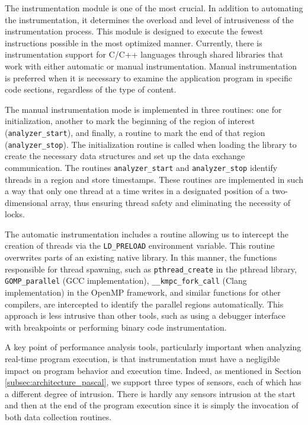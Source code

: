 The instrumentation module is one of the most crucial. In addition to automating the instrumentation, it determines the overload and level of intrusiveness of the instrumentation process. This module is designed to execute the fewest instructions possible in the most optimized manner. Currently, there is instrumentation support for C/C++ languages through shared libraries that work with either automatic or manual instrumentation. Manual instrumentation is preferred when it is necessary to examine the application program in specific code sections, regardless of the type of content. 

The manual instrumentation mode is implemented in three routines: one for initialization, another to mark the beginning of the region of interest ({\tt analyzer\_start}), and finally, a routine to mark the end of that region ({\tt analyzer\_stop}). The initialization routine is called when loading the library to create the necessary data structures and set up the data exchange communication. The routines {\tt analyzer\_start} and {\tt analyzer\_stop} identify threads in a region and store timestamps. These routines are implemented in such a way that only one thread at a time writes in a designated position of a two-dimensional array, thus ensuring thread safety and eliminating the necessity of locks.

The automatic instrumentation includes a routine allowing us to intercept the creation of threads via the {\tt LD\_PRELOAD} environment variable. This routine overwrites parts of an existing native library. In this manner, the functions responsible for thread spawning, such as {\tt pthread\_create} in the pthread library, {\tt GOMP\_parallel} (GCC implementation), {\tt \_\_kmpc\_fork\_call} (Clang implementation) in the OpenMP framework, and similar functions for other compilers, are intercepted to identify the parallel regions automatically. This approach is less intrusive than other tools, such as using a debugger interface with breakpoints or performing binary code instrumentation.

A key point of performance analysis tools, particularly important when analyzing real-time program execution, is that instrumentation must have a negligible impact on program behavior and execution time. Indeed, as mentioned in Section \ref{subsec:architecture_pascal}, we support three types of sensors, each of which has a different degree of intrusion.
There is hardly any sensors intrusion at the start and then at the end of the program execution since it is simply the invocation of both data collection routines.

